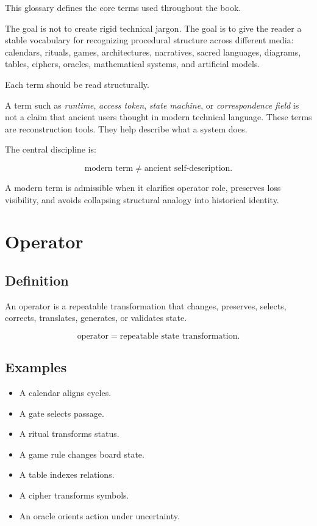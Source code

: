 \documentclass[11pt]{book}
\begin{document}
This glossary defines the core terms used throughout the book.

The goal is not to create rigid technical jargon. The goal is to give the reader a stable vocabulary for recognizing procedural structure across different media: calendars, rituals, games, architectures, narratives, sacred languages, diagrams, tables, ciphers, oracles, mathematical systems, and artificial models.

Each term should be read structurally.

A term such as \emph{runtime}, \emph{access token}, \emph{state machine}, or \emph{correspondence field} is not a claim that ancient users thought in modern technical language. These terms are reconstruction tools. They help describe what a system does.

The central discipline is:

\[
\text{modern term} \neq \text{ancient self-description}.
\]

A modern term is admissible when it clarifies operator role, preserves loss visibility, and avoids collapsing structural analogy into historical identity.

\section{Operator}

\subsection*{Definition}

An operator is a repeatable transformation that changes, preserves, selects, corrects, translates, generates, or validates state.

\[
\text{operator} = \text{repeatable state transformation}.
\]

\subsection*{Examples}

\begin{itemize}
    \item A calendar aligns cycles.
    \item A gate selects passage.
    \item A ritual transforms status.
    \item A game rule changes board state.
    \item A table indexes relations.
    \item A cipher transforms symbols.
    \item An oracle orients action under uncertainty.
\end{itemize}
\end{document}
